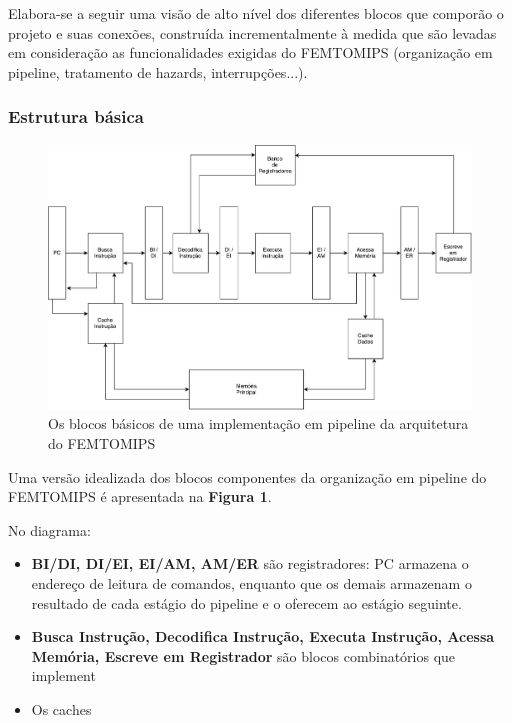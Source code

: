 \documentclass[11pt,a4paper]{article}
\begin{document}
	Elabora-se a seguir uma visão de alto nível dos diferentes blocos que comporão o projeto e suas conexões, construída incrementalmente à medida que são levadas em consideração as funcionalidades exigidas do FEMTOMIPS (organização em pipeline, tratamento de hazards, interrupções...).

\subsubsection{Estrutura básica}

	\begin{figure}[!ht]
  	\centering	
    \includegraphics[scale=0.35, angle=0]{FEMTOMIPS_GLOBAL1}
    \caption{Os blocos básicos de uma implementação em pipeline da arquitetura do FEMTOMIPS}
	\end{figure}

	Uma versão idealizada dos blocos componentes da organização em pipeline do FEMTOMIPS é apresentada na \textbf{Figura 1}. 
	
	
	No diagrama: 
	
	\begin{itemize}
	\item \textbf{BI/DI, DI/EI, EI/AM, AM/ER} são registradores: PC armazena o endereço de leitura de comandos, enquanto que os demais armazenam o resultado de cada estágio do pipeline e o oferecem ao estágio seguinte. 
	\item \textbf{Busca Instrução, Decodifica Instrução, Executa Instrução, Acessa Memória, Escreve em Registrador} são blocos combinatórios que implement
	\item Os caches
	\end{itemize}
		
	
\end{document}
